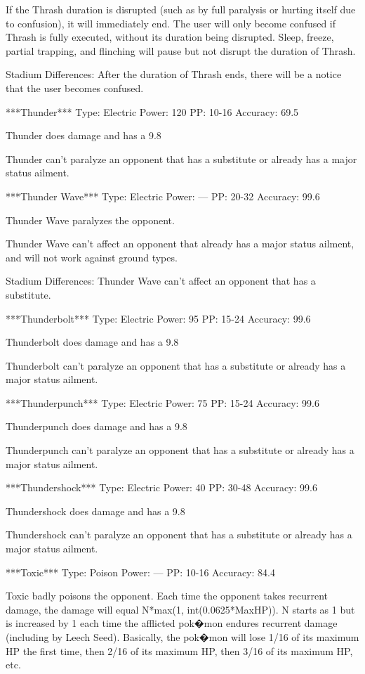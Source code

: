\documentclass[reprint, aps, prl, paper=A4]{revtex4-1}
\begin{document}
If the Thrash duration is disrupted (such as by full paralysis or hurting itself due to
confusion), it will immediately end. The user will only become confused if Thrash is fully
executed, without its duration being disrupted. Sleep, freeze, partial trapping, and flinching
will pause but not disrupt the duration of Thrash.

Stadium Differences:
After the duration of Thrash ends, there will be a notice that the user becomes confused.


***Thunder***
Type: Electric
Power: 120
PP: 10-16
Accuracy: 69.5%

Thunder does damage and has a 9.8%

Thunder can't paralyze an opponent that has a substitute or already has a major status
ailment.


***Thunder Wave***
Type: Electric
Power: ---
PP: 20-32
Accuracy: 99.6%

Thunder Wave paralyzes the opponent.

Thunder Wave can't affect an opponent that already has a major status ailment, and will not
work against ground types.

Stadium Differences:
Thunder Wave can't affect an opponent that has a substitute.


***Thunderbolt***
Type: Electric
Power: 95
PP: 15-24
Accuracy: 99.6%

Thunderbolt does damage and has a 9.8%

Thunderbolt can't paralyze an opponent that has a substitute or already has a major status
ailment.


***Thunderpunch***
Type: Electric
Power: 75
PP: 15-24
Accuracy: 99.6%

Thunderpunch does damage and has a 9.8%

Thunderpunch can't paralyze an opponent that has a substitute or already has a major status
ailment.


***Thundershock***
Type: Electric
Power: 40
PP: 30-48
Accuracy: 99.6%

Thundershock does damage and has a 9.8%

Thundershock can't paralyze an opponent that has a substitute or already has a major status
ailment.


***Toxic***
Type: Poison
Power: ---
PP: 10-16
Accuracy: 84.4%

Toxic badly poisons the opponent. Each time the opponent takes recurrent damage, the damage
will equal N*max(1, int(0.0625*MaxHP)). N starts as 1 but is increased by 1 each time the
afflicted pok�mon endures recurrent damage (including by Leech Seed). Basically, the pok�mon
will lose 1/16 of its maximum HP the first time, then 2/16 of its maximum HP, then 3/16 of its
maximum HP, etc.
\end{document}
